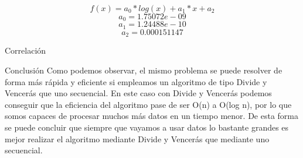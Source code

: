 \documentclass[12pt]{beamer}
\begin{document}
\begin{frame}
\[
f(x)=a_0*log(x)+a_1*x+a_2
\]
\[
a_0=1.75072e-09
\]
\[
a_1=1.24488e-10
\]
\[
a_2=0.000151147 
\]
\end{frame}

\begin{frame}{Correlación}

\end{frame}

\begin{frame}{Conclusión}
Como podemos observar, el mismo problema se puede resolver de forma más rápida y eficiente si empleamos un algoritmo de tipo Divide y Vencerás que uno secuencial.
\vspace{5mm} %
En este caso con Divide y Vencerás podemos conseguir que la eficiencia del algoritmo pase de ser O(n) a O(log n), por lo que somos capaces de procesar muchos más datos en un tiempo menor. 
\vspace{5mm} %
De esta forma se puede concluir que siempre que vayamos a usar datos lo bastante grandes es mejor realizar el algoritmo mediante Divide y Vencerás que mediante uno secuencial. 
\end{frame}
\end{document}
